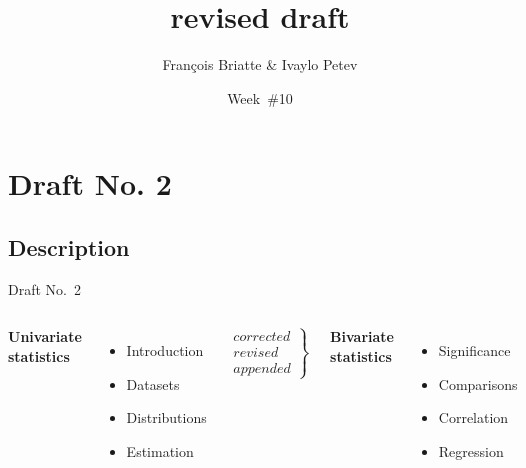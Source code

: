 \documentclass[t]{beamer}
\title{revised draft}
\author{François Briatte \& Ivaylo Petev}
\date{Week~\#10}
\begin{document}
	
    \frame[plain]{
		\titlepage\\[7em]
		\tableofcontents[hideallsubsections]
		}


	\section{Draft No. 2}	
	
	\subsection{Description}
	
	\begin{frame}[t]{Draft No.~2}
	
	\begin{columns}[T]

			\textbf{Univariate\\statistics}\\[.5em]
	
			\begin{itemize}
				\item Introduction
				\item Datasets
				\item Distributions
				\item Estimation
			\end{itemize}
			
			$$
			\left.
			    \begin{array}{rrr}
			        corrected \\
			        revised\\
			        appended
			    \end{array}
			\right \} 
			$$	
		
		
			\textbf{Bivariate\\statistics}
	
			\begin{itemize}
				\item Significance
				\item Comparisons
				\item Correlation
				\item Regression
			\end{itemize}
			

\end{columns}
\end{frame}
\end{document}
